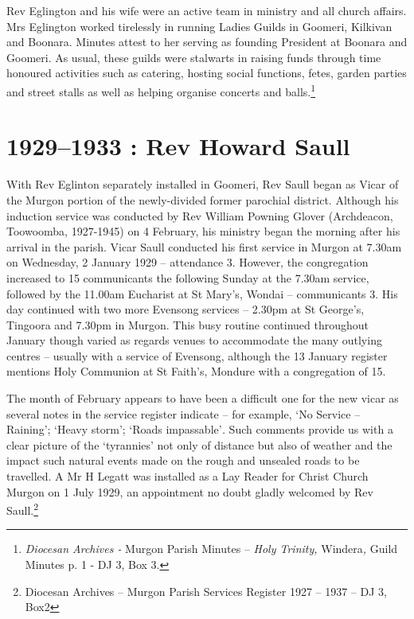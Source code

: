 Rev Eglington and his wife were an active team in ministry and all
church affairs. Mrs Eglington worked tirelessly in running Ladies Guilds
in Goomeri, Kilkivan and Boonara. Minutes attest to her serving as
founding President at Boonara and Goomeri. As usual, these guilds were
stalwarts in raising funds through time honoured activities such as
catering, hosting social functions, fetes, garden parties and street
stalls as well as helping organise concerts and balls.\footnote{\emph{Diocesan
  Archives -} Murgon Parish Minutes -- \emph{Holy Trinity,}
  Windera\emph{,} Guild Minutes p. 1 - DJ 3, Box 3.}

\printendnotes
\setcounter{endnote}{0}
\chapter{1929--1933 : Rev Howard Saull}

With Rev Eglinton separately installed in Goomeri, Rev Saull began as
Vicar of the Murgon portion of the newly-divided former parochial
district. Although his induction service was conducted by Rev William
Powning Glover (Archdeacon, Toowoomba, 1927-1945) on 4 February, his
ministry began the morning after his arrival in the parish. Vicar Saull
conducted his first service in Murgon at 7.30am on Wednesday, 2 January
1929 -- attendance 3. However, the congregation increased to 15
communicants the following Sunday at the 7.30am service, followed by the
11.00am Eucharist at St Mary's, Wondai -- communicants 3. His day
continued with two more Evensong services -- 2.30pm at St George's,
Tingoora and 7.30pm in Murgon. This busy routine continued throughout
January though varied as regards venues to accommodate the many outlying
centres -- usually with a service of Evensong, although the 13 January
register mentions Holy Communion at St Faith's, Mondure with a
congregation of 15.

The month of February appears to have been a difficult one for the new
vicar as several notes in the service register indicate -- for example,
`No Service -- Raining'; `Heavy storm'; `Roads impassable'\emph{.} Such
comments provide us with a clear picture of the `tyrannies' not only of
distance but also of weather and the impact such natural events made on
the rough and unsealed roads to be travelled. A Mr H Legatt was
installed as a Lay Reader for Christ Church Murgon on 1 July 1929, an
appointment no doubt gladly welcomed by Rev Saull.\footnote{Diocesan
  Archives -- Murgon Parish Services Register 1927 -- 1937 -- DJ 3, Box2}

